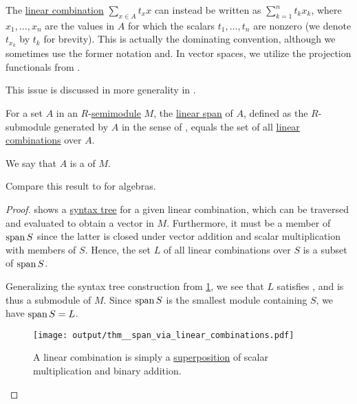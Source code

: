 \begin{remark}\label{rem:linear_combinations}
  The \hyperref[def:free_semimodule]{linear combination} \( \sum_{x \in A} t_x x \) can instead be written as \( \sum_{k=1}^n t_k x_k \), where \( x_1, \ldots, x_n \) are the values in \( A \) for which the scalars \( t_1, \ldots, t_n \) are nonzero (we denote \( t_{x_k} \) by \( t_k \) for brevity). This is actually the dominating convention, although we sometimes use the former notation and. In vector spaces, we utilize the projection functionals from .

  This issue is discussed in more generality in .
\end{remark}

\begin{proposition}\label{thm:span_via_linear_combinations}
  For a set \( A \) in an \( R \)-\hyperref[def:semimodule]{semimodule} \( M \), the \hyperref[def:semimodule/submodel]{linear span} of \( A \), defined as the \( R \)-submodule generated by \( A \) in the sense of , equals the set of all \hyperref[rem:linear_combinations]{linear combinations} over \( A \).

  We say that \( A \) is a  of \( M \).

  Compare this result to  for algebras.
\end{proposition}
\begin{proof}
   shows a \hyperref[def:concrete_syntax_tree]{syntax tree} for a given linear combination, which can be traversed and evaluated to obtain a vector in \( M \). Furthermore, it must be a member of \( \operatorname{span} S \) since the latter is closed under vector addition and scalar multiplication with members of \( S \). Hence, the set \( L \) of all linear combinations over \( S \) is a subset of \( \operatorname{span} S \).

  Generalizing the syntax tree construction from \cref{fig:thm:span_via_linear_combinations}, we see that \( L \) satisfies , and is thus a submodule of \( M \). Since \( \operatorname{span} S \) is the smallest module containing \( S \), we have \( \operatorname{span} S = L \).

  \begin{figure}[h]
    \hfill
    \texttt{[image: output/thm\_\_span\_via\_linear\_combinations.pdf]}
    \hfill\hfill
    \caption{A linear combination is simply a \hyperref[def:multi_valued_function/superposition]{superposition} of scalar multiplication and binary addition.}
    \label{fig:thm:span_via_linear_combinations}
  \end{figure}
\end{proof}

